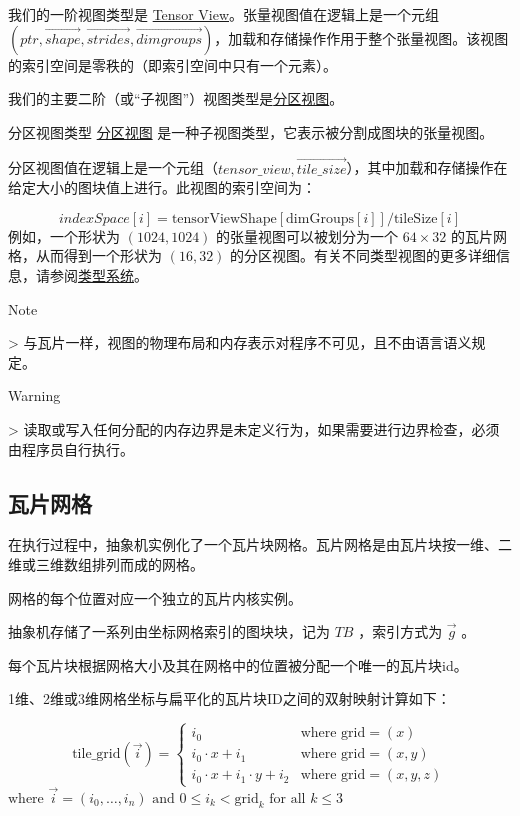 \documentclass{article}
\begin{document}
我们的一阶视图类型是 \href{https://docs.nvidia.com/cuda/tile-ir/latest/sections/types.html#type-tensor-view}{Tensor View}。张量视图值在逻辑上是一个元组 $(ptr, \vec{shape}, \vec{strides}, \vec{dimgroups})$，加载和存储操作作用于整个张量视图。该视图的索引空间是零秩的（即索引空间中只有一个元素）。


我们的主要二阶（或``子视图''）视图类型是\href{https://docs.nvidia.com/cuda/tile-ir/latest/sections/types.html#type-partition-view}{分区视图}。


分区视图类型 \href{https://docs.nvidia.com/cuda/tile-ir/latest/sections/types.html#type-partition-view}{分区视图} 是一种子视图类型，它表示被分割成图块的张量视图。

分区视图值在逻辑上是一个元组（$tensor\_view, \vec{tile\_size}$），其中加载和存储操作在给定大小的图块值上进行。此视图的索引空间为：


$$indexSpace[i] = \mathrm{tensorViewShape}[\mathrm{dimGroups}[i]] / \mathrm{tileSize}[i]$$
例如，一个形状为 $(1024, 1024)$ 的张量视图可以被划分为一个 $64 \times 32$ 的瓦片网格，从而得到一个形状为 $(16, 32)$ 的分区视图。有关不同类型视图的更多详细信息，请参阅\href{https://docs.nvidia.com/cuda/tile-ir/latest/sections/types.html#section-types}{类型系统}。


Note

> 与瓦片一样，视图的物理布局和内存表示对程序不可见，且不由语言语义规定。


Warning

> 读取或写入任何分配的内存边界是未定义行为，如果需要进行边界检查，必须由程序员自行执行。




\subsection{瓦片网格}

在执行过程中，抽象机实例化了一个瓦片块网格。瓦片网格是由瓦片块按一维、二维或三维数组排列而成的网格。


网格的每个位置对应一个独立的瓦片内核实例。


抽象机存储了一系列由坐标网格索引的图块块，记为 $T B$ ，索引方式为 $\vec{g}$ 。

每个瓦片块根据网格大小及其在网格中的位置被分配一个唯一的瓦片块id。


1维、2维或3维网格坐标与扁平化的瓦片块ID之间的双射映射计算如下：

$$\mathrm{tile\_grid}(\vec{i})=\begin{cases}
    i_0 & \text{where grid}=(x) \\
    i_0 \cdot x + i_1 & \text{where grid}=(x,y) \\
    i_0 \cdot x + i_1 \cdot y + i_2 & \text{where grid}=(x,y,z)
\end{cases}$$
$\text{where }\vec{i}=(i_0,\ldots,i_n) \text{ and }0\leq i_k<\text{grid}_k\text{ for all } k\leq 3$
\end{document}
